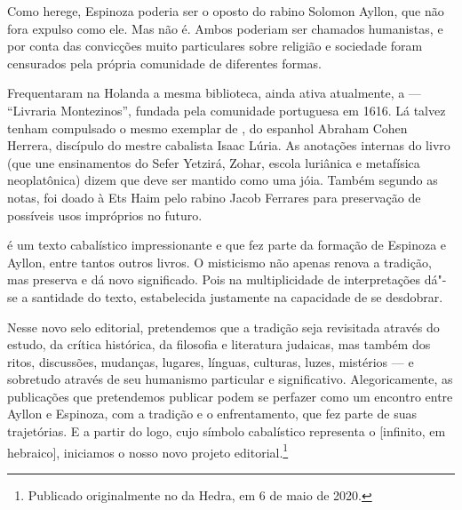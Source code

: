 \begin{changemargin}
Como herege, Espinoza poderia ser o oposto do rabino Solomon Ayllon, que não fora expulso como ele. Mas não é. Ambos poderiam ser chamados humanistas, e por conta das convicções muito particulares sobre religião e sociedade foram censurados pela própria comunidade de diferentes formas. 

Frequentaram na Holanda a mesma biblioteca, ainda ativa atualmente, a {} --- ``Livraria Montezinos'', fundada pela comunidade portuguesa em 1616. Lá talvez tenham compulsado o mesmo exemplar de {}, do espanhol Abraham Cohen Herrera, discípulo do mestre cabalista Isaac Lúria. As anotações internas do livro (que une ensinamentos do Sefer Yetzirá, Zohar, escola luriânica e metafísica neoplatônica) dizem que deve ser mantido como uma jóia. Também segundo as notas, foi doado à Ets Haim pelo rabino Jacob Ferrares para preservação de possíveis usos impróprios no futuro. 

{} é um texto cabalístico impressionante e que fez parte da formação de Espinoza e Ayllon, entre tantos outros livros. O misticismo não apenas renova a tradição, mas preserva e dá novo significado. Pois na multiplicidade de interpretações dá"-se a santidade do texto, estabelecida justamente na capacidade de se desdobrar.

Nesse novo selo editorial, pretendemos que a tradição seja revisitada através do estudo, da crítica histórica, da filosofia e literatura judaicas, mas também dos ritos, discussões, mudanças, lugares, línguas, culturas, luzes, mistérios --- e sobretudo através de seu humanismo particular e significativo. Alegoricamente, as publicações que pretendemos publicar podem se perfazer como um encontro entre Ayllon e Espinoza, com a tradição e o enfrentamento, que fez parte de suas trajetórias. E a partir do logo, cujo símbolo cabalístico representa o {} [infinito, em hebraico], iniciamos o nosso novo projeto editorial.\footnote{Publicado originalmente no {} da Hedra, em 6 de maio de 2020.}

\pagebreak
\end{changemargin}